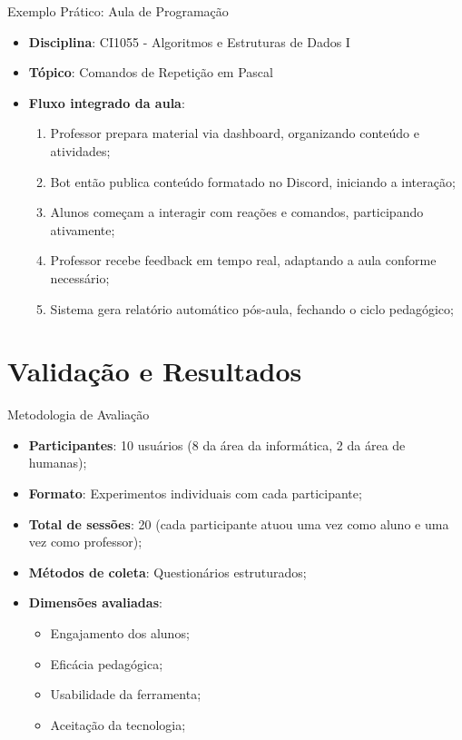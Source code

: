 \documentclass[aspectratio=169]{beamer}
\begin{document}
{\begin{frame}{Exemplo Prático: Aula de Programação}
  \begin{itemize}
  \item \textbf{Disciplina}: CI1055 - Algoritmos e Estruturas de Dados I
  \item \textbf{Tópico}: Comandos de Repetição em Pascal
  \item \textbf{Fluxo integrado da aula}:
    \begin{enumerate}
    \item Professor prepara material via dashboard, organizando conteúdo e atividades;
    \item Bot então publica conteúdo formatado no Discord, iniciando a interação;
    \item Alunos começam a interagir com reações e comandos, participando ativamente;
    \item Professor recebe feedback em tempo real, adaptando a aula conforme necessário;
    \item Sistema gera relatório automático pós-aula, fechando o ciclo pedagógico;
    \end{enumerate}
  \end{itemize}
\end{frame}

\section{Validação e Resultados}

\begin{frame}{Metodologia de Avaliação}
  \begin{itemize}
  \item \textbf{Participantes}: 10 usuários (8 da área da informática, 2 da área de humanas);
  \item \textbf{Formato}: Experimentos individuais com cada participante;
  \item \textbf{Total de sessões}: 20 (cada participante atuou uma vez como aluno e uma vez como professor);
  \item \textbf{Métodos de coleta}: Questionários estruturados;
  \item \textbf{Dimensões avaliadas}:
    \begin{itemize}
    \item Engajamento dos alunos;
    \item Eficácia pedagógica;
    \item Usabilidade da ferramenta;
    \item Aceitação da tecnologia;
    \end{itemize}
  \end{itemize}
\end{frame}

}
\end{document}
